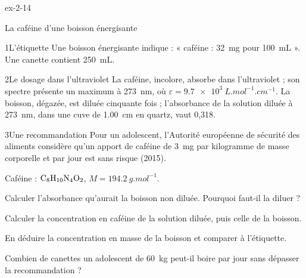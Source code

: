 \begin{blocLivre}{ex-2-14}
\begin{exercice}[3]{La caféine d'une boisson énergisante}
\begin{docu}{1}{L'étiquette}
Une boisson énergisante indique : « caféine : \qty{32}{mg} pour \qty{100}{mL} ». Une canette contient \qty{250}{mL}.
\end{docu}
\begin{docu}{2}{Le dosage dans l'ultraviolet}
La caféine, incolore, absorbe dans l'ultraviolet ; son spectre présente un maximum à \qty{273}{nm}, où $\varepsilon=\qty{9,7e3}{L.mol^{-1}.cm^{-1}}$.
La boisson, dégazée, est diluée cinquante fois ; l'absorbance de la solution diluée à \qty{273}{nm}, dans une cuve de \qty{1,00}{cm} en
quartz, vaut 0,318.
\end{docu}
\begin{docu}{3}{Une recommandation}
Pour un adolescent, l'Autorité européenne de sécurité des aliments considère qu'un apport de caféine de \qty{3}{mg} par
kilogramme de masse corporelle et par jour est sans risque (2015).
\end{docu}
\begin{donnees}
Caféine : $\ce{C8H10N4O2}$, $M=\qty{194,2}{g.mol^{-1}}$.
\end{donnees}
\begin{questions}
\item Calculer l'absorbance qu'aurait la boisson non diluée. Pourquoi faut-il la diluer ?
\item Calculer la concentration en caféine de la solution diluée, puis celle de la boisson.
\item En déduire la concentration en masse de la boisson et comparer à l'étiquette.
\item \initiative Combien de canettes un adolescent de \qty{60}{kg} peut-il boire par jour sans dépasser la recommandation ?
\end{questions}
\end{exercice}
\end{blocLivre}
